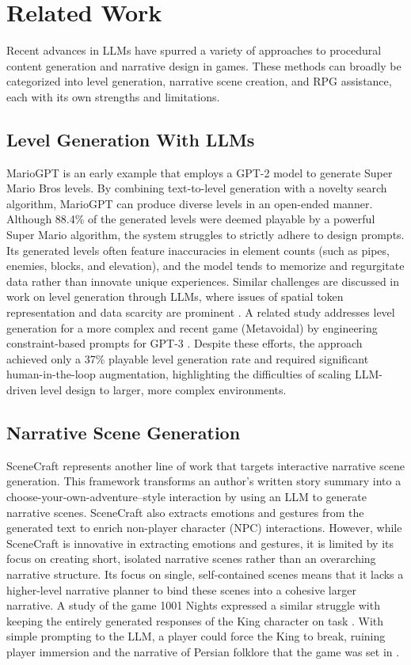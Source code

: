 \section{Related Work}
Recent advances in LLMs have spurred a variety of approaches to procedural content generation and narrative design in games. These methods can broadly be categorized into level generation, narrative scene creation, and RPG assistance, each with its own strengths and limitations.

\subsection{Level Generation With LLMs}
MarioGPT \cite{MarioGPT} is an early example that employs a GPT-2 \cite{GPT2} model to generate Super Mario Bros levels. By combining text-to-level generation with a novelty search algorithm, MarioGPT can produce diverse levels in an open-ended manner. Although 88.4\% of the generated levels were deemed playable by a powerful Super Mario algorithm, the system struggles to strictly adhere to design prompts. Its generated levels often feature inaccuracies in element counts (such as pipes, enemies, blocks, and elevation), and the model tends to memorize and regurgitate data rather than innovate unique experiences. Similar challenges are discussed in work on level generation through LLMs, where issues of spatial token representation and data scarcity are prominent \cite{Sokoban}. A related study \cite{Metavoidal} addresses level generation for a more complex and recent game (Metavoidal) by engineering constraint-based prompts for GPT-3 \cite{GPT3}. Despite these efforts, the approach achieved only a 37\% playable level generation rate and required significant human-in-the-loop augmentation, highlighting the difficulties of scaling LLM-driven level design to larger, more complex environments.

\subsection{Narrative Scene Generation}
SceneCraft \cite{SceneCraft} represents another line of work that targets interactive narrative scene generation. This framework transforms an author's written story summary into a choose-your-own-adventure–style interaction by using an LLM to generate narrative scenes. SceneCraft also extracts emotions and gestures from the generated text to enrich non-player character (NPC) interactions. However, while SceneCraft is innovative in extracting emotions and gestures, it is limited by its focus on creating short, isolated narrative scenes rather than an overarching narrative structure. Its focus on single, self-contained scenes means that it lacks a higher-level narrative planner to bind these scenes into a cohesive larger narrative. A study of the game 1001 Nights expressed a similar struggle with keeping the entirely generated responses of the King character on task \cite{1001Nights}. With simple prompting to the LLM, a player could force the King to break, ruining player immersion and the narrative of Persian folklore that the game was set in \cite{1001Nights}.   

